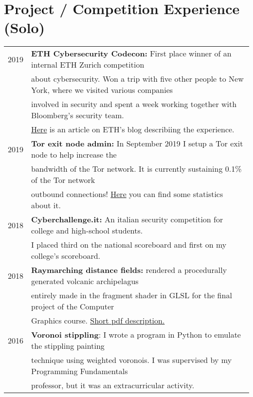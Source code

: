 \documentclass[a4paper,10pt]{article} %
\begin{document}
\section{Project / Competition Experience (Solo)}
\begin{tabular}{rl}
2019 &  \textbf{ETH Cybersecurity Codecon:} First place winner of an internal ETH Zurich competition \\
	 & about cybersecurity. Won a trip with five other people to New York, where we visited various companies \\
	 & involved in security and spent a week working together with Bloomberg's security team. \\
	 & \href{https://blogs.ethz.ch/ETHambassadors/2019/06/27/meeting-michael-bloomberg/}{Here} is an article on ETH's blog describiing the experience.\\
2019 & \textbf{Tor exit node admin:} In September 2019 I setup a Tor exit node to help increase the\\
	 & bandwidth of the Tor network. It is currently sustaining 0.1\% of the Tor network\\
	 & outbound connections! \href{https://metrics.torproject.org/rs.html#details/229D865D7AC084D30E5F5016CE5A8C21740F74F4}{Here} you can find some statistics about it. \\
2018 &  \textbf{Cyberchallenge.it:} An italian security competition for college and high-school students.\\
	 & I placed third on the national scoreboard and first on my college's scoreboard.\\
2018 &  \textbf{Raymarching distance fields:} rendered a procedurally generated volcanic archipelagus \\
     & entirely made in the fragment shader in GLSL for the final project of the Computer \\
	 & Graphics course. \href{https://drive.google.com/open?id=1U4zynGm8o4i8VodnaWTOjgoayj9rhega}{Short pdf description.} \\
2016 &  \textbf{Voronoi stippling}: I wrote a program in Python to emulate the stippling painting \\
     & technique using weighted voronois. I was supervised by my Programming Fundamentals \\
     & professor, but it was an extracurricular activity. \\

\end{tabular}
\end{document}
